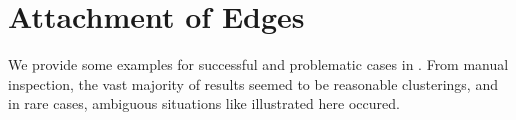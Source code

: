 \documentclass[
	fontsize=10pt, %
	twoside=false, %
	secnumdepth=1, %
]{kaobook}
\begin{document}
\section{Attachment of Edges}


We provide some examples for successful and problematic cases in
. From manual inspection, the vast majority of
results seemed to be reasonable clusterings, and in rare cases, ambiguous
situations like illustrated here occured.

\end{document}
